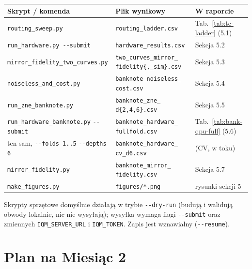 \documentclass[11pt,a4paper]{article}
\begin{document}
\begin{center}
\scriptsize
\renewcommand{\arraystretch}{1.25}
\begin{tabular}{@{}>{\raggedright\arraybackslash}p{5.1cm}>{\raggedright\arraybackslash}p{5.3cm}>{\raggedright\arraybackslash}p{3.3cm}@{}}
\toprule
\textbf{Skrypt / komenda} & \textbf{Plik wynikowy} & \textbf{W raporcie} \\
\midrule
\texttt{routing\_sweep.py} & \texttt{routing\_ladder.csv} & Tab.~\ref{tab:tc-ladder} (5.1) \\
\texttt{run\_hardware.py -\/-submit} & \texttt{hardware\_results.csv} & Sekcja 5.2 \\
\texttt{mirror\_fidelity\_two\_curves.py} & \texttt{two\_curves\_mirror\_} \texttt{fidelity\{,\_sim\}.csv} & Sekcja 5.3 \\
\texttt{noiseless\_and\_cost.py} & \texttt{banknote\_noiseless\_} \texttt{cost.csv} & Sekcja 5.4 \\
\texttt{run\_zne\_banknote.py} & \texttt{banknote\_zne\_} \texttt{d\{2,4,6\}.csv} & Sekcja 5.5 \\
\texttt{run\_hardware\_banknote.py} \texttt{-\/-submit} & \texttt{banknote\_hardware\_} \texttt{fullfold.csv} & Tab.~\ref{tab:bank-qpu-full} (5.6) \\
ten sam, \texttt{-\/-folds 1..5} \texttt{-\/-depths 6} & \texttt{banknote\_hardware\_} \texttt{cv\_d6.csv} & 5.6 (CV, w toku) \\
\texttt{mirror\_fidelity.py} & \texttt{banknote\_mirror\_} \texttt{fidelity.csv} & Sekcja 5.7 \\
\texttt{make\_figures.py} & \texttt{figures/*.png} & rysunki sekcji 5 \\
\bottomrule
\end{tabular}
\renewcommand{\arraystretch}{1.0}
\end{center}

\noindent Skrypty sprzętowe domyślnie działają w trybie \texttt{-\/-dry-run} (budują i walidują
obwody lokalnie, nic nie wysyłają); wysyłka wymaga flagi \texttt{-\/-submit} oraz zmiennych
\texttt{IQM\_SERVER\_URL} i \texttt{IQM\_TOKEN}. Zapis jest wznawialny (\texttt{-\/-resume}).

\section{Plan na Miesiąc 2}
\end{document}
